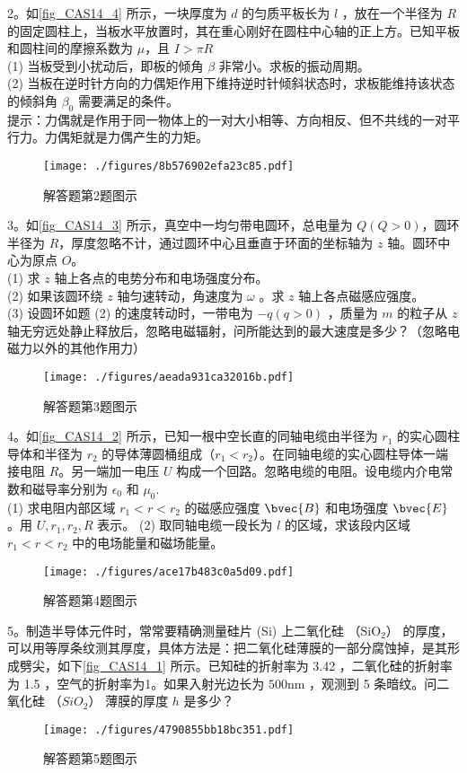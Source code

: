 2。如\autoref{fig_CAS14_4} 所示，一块厚度为 $d$ 的匀质平板长为 $l$ ，放在一个半径为 $R$ 的固定圆柱上，当板水平放置时，其在重心刚好在圆柱中心轴的正上方。已知平板和圆柱间的摩擦系数为 $\mu$，且 $I>\pi R$\\
(1) 当板受到小扰动后，即板的倾角 $\beta$ 非常小。求板的振动周期。\\
(2) 当板在逆时针方向的力偶矩作用下维持逆时针倾斜状态时，求板能维持该状态的倾斜角 $\beta_0$ 需要满足的条件。\\
提示：力偶就是作用于同一物体上的一对大小相等、方向相反、但不共线的一对平行力。力偶矩就是力偶产生的力矩。
\begin{figure}[ht]
\centering
\texttt{[image: ./figures/8b576902efa23c85.pdf]}
\caption{解答题第2题图示} \label{fig_CAS14_4}
\end{figure}

3。如\autoref{fig_CAS14_3} 所示，真空中一均匀带电圆环，总电量为 $Q(Q>0)$，圆环半径为 $R$，厚度忽略不计，通过圆环中心且垂直于环面的坐标轴为 $z$ 轴。圆环中心为原点 $O$。\\
(1) 求 $z$ 轴上各点的电势分布和电场强度分布。\\
(2) 如果该圆环绕 $z$ 轴匀速转动，角速度为 $\omega$ 。求 $z$ 轴上各点磁感应强度。\\
(3) 设圆环如题 (2) 的速度转动时，一带电为 $-q(q>0)$ ，质量为 $m$ 的粒子从 $z$ 轴无穷远处静止释放后，忽略电磁辐射，问所能达到的最大速度是多少？（忽略电磁力以外的其他作用力）
\begin{figure}[ht]
\centering
\texttt{[image: ./figures/aeada931ca32016b.pdf]}
\caption{解答题第3题图示} \label{fig_CAS14_3}
\end{figure}

4。如\autoref{fig_CAS14_2} 所示，已知一根中空长直的同轴电缆由半径为 $r_1$ 的实心圆柱导体和半径为 $r_2$ 的导体薄圆桶组成（$r_1<r_2$）。在同轴电缆的实心圆柱导体一端接电阻 $R$。另一端加一电压 $U$ 构成一个回路。忽略电缆的电阻。设电缆内介电常数和磁导率分别为 $\epsilon_0$ 和 $\mu_0$.\\
(1) 求电阻内部区域 $r_1<r<r_2$ 的磁感应强度 $\bvec{B}$ 和电场强度 $\bvec{E}$。用 $U,r_1,r_2,R$ 表示。
(2) 取同轴电缆一段长为 $l$ 的区域，求该段内区域 $r_1<r<r_2$ 中的电场能量和磁场能量。
\begin{figure}[ht]
\centering
\texttt{[image: ./figures/ace17b483c0a5d09.pdf]}
\caption{解答题第4题图示} \label{fig_CAS14_2}
\end{figure}

5。制造半导体元件时，常常要精确测量硅片 (Si) 上二氧化硅 （$\mathrm{SiO_2}$） 的厚度，可以用等厚条纹测其厚度，具体方法是：把二氧化硅薄膜的一部分腐蚀掉，是其形成劈尖，如下\autoref{fig_CAS14_1} 所示。已知硅的折射率为 3.42 ，二氧化硅的折射率为 1.5 ，空气的折射率为1。如果入射光边长为 $500\mathrm{nm}$ ，观测到 5 条暗纹。问二氧化硅 （$SiO_2$） 薄膜的厚度 $h$ 是多少？
\begin{figure}[ht]
\centering
\texttt{[image: ./figures/4790855bb18bc351.pdf]}
\caption{解答题第5题图示} \label{fig_CAS14_1}
\end{figure}
